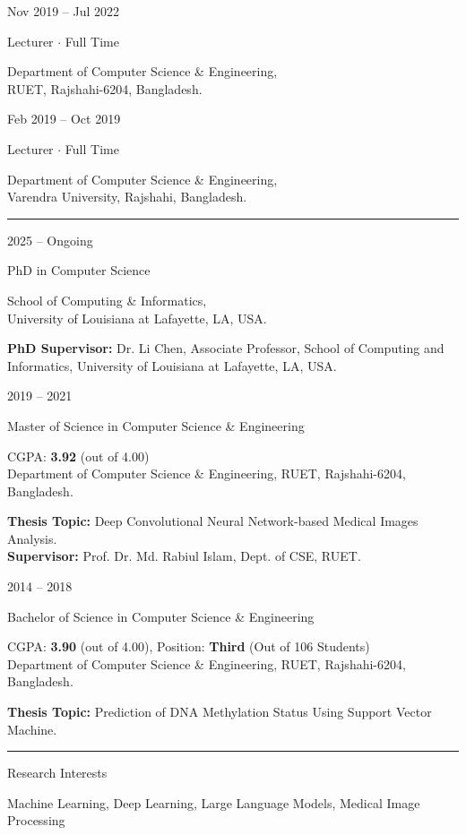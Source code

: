 \documentclass[a4paper,10pt]{article}
\newlength{\cvcolumngapwidth}
\newlength{\cvleftcolumnwidth}
\newlength{\cvrightcolumnwidth}
\newcommand{\cvsectionstyle}[1]{{\normalsize\cvsectionfont\textcolor{cvsectioncolor}{#1}}}
\newcommand{\cvtitlestyle}[1]{{\large\cvtitlefont\textcolor{cvtitlecolor}{#1}}}
\newcommand{\cvdurationstyle}[1]{{\small\cvdurationfont\textcolor{cvdurationcolor}{#1}}}
\newcommand{\cvheadingstyle}[1]{{\normalsize\cvheadingfont\textcolor{cvheadingcolor}{#1}}}
\newlength{\cvafteritemskipamount}
\newlength{\cvaftersectionskipamount}
\newlength{\cvbetweensectionandheadingextraskipamount}
\newlength{\cvaftertitleskipamount}
\newlength{\cvparskip}
\newcommand{\cvsection}[1]{
    \begin{minipage}[t]{\cvleftcolumnwidth}
        \raggedleft\cvsectionstyle{#1}
    \end{minipage}%
    \hspace{\cvcolumngapwidth}%
    \begin{minipage}[t]{\cvrightcolumnwidth}
        \textcolor{cvrulecolor}{\rule{\cvrightcolumnwidth}{0.3mm}}
    \end{minipage}

    \vspace{\cvaftersectionskipamount}
}
\newcommand{\cvitem}[2]{
    \begin{minipage}[t]{\cvleftcolumnwidth}
        \raggedleft #1
    \end{minipage}%
    \hspace{\cvcolumngapwidth}%
    \begin{minipage}[t]{\cvrightcolumnwidth}
        \setlength{\parskip}{\cvparskip} #2
    \end{minipage}

    \vspace{\cvafteritemskipamount}
}
\newcommand{\cvtitle}[1]{
    \cvtitlestyle{#1}

    \vspace{\cvaftertitleskipamount}
    \vspace{-\cvparskip}
}
\begin{document}
\cvitem{
    \cvdurationstyle{Nov 2019 -- Jul 2022}
}{
    \cvtitle{Lecturer $\cdot$ Full Time}

    Department of Computer Science \& Engineering,\\
    RUET, Rajshahi-6204, Bangladesh.
}

\cvitem{
    \cvdurationstyle{Feb 2019 -- Oct 2019}
}{
    \cvtitle{Lecturer $\cdot$ Full Time}

    Department of Computer Science \& Engineering,\\
    Varendra University, Rajshahi, Bangladesh.
}


\cvsection{EDUCATION}

\cvitem{
    \cvdurationstyle{2025 -- Ongoing}
}{
    \cvtitle{PhD in Computer Science}

    School of Computing \& Informatics,\\
    University of Louisiana at Lafayette, LA, USA.

    \textbf{PhD Supervisor:} Dr. Li Chen, Associate Professor, School of Computing and Informatics, University of Louisiana at Lafayette, LA, USA.
}

\cvitem{
    \cvdurationstyle{2019 -- 2021}
}{
    \cvtitle{Master of Science in Computer Science \& Engineering}
    CGPA: \textbf{3.92} (out of 4.00)\\
    Department of Computer Science \& Engineering, RUET, Rajshahi-6204, Bangladesh.

    \textbf{Thesis Topic:} Deep Convolutional Neural Network-based Medical Images Analysis.\\
    \textbf{Supervisor:} Prof. Dr. Md. Rabiul Islam, Dept. of CSE, RUET.
}

\cvitem{
    \cvdurationstyle{2014 -- 2018}
}{
    \cvtitle{Bachelor of Science in Computer Science \& Engineering}
    CGPA: \textbf{3.90} (out of 4.00), Position: \textbf{Third} (Out of 106 Students)\\
    Department of Computer Science \& Engineering, RUET, Rajshahi-6204, Bangladesh.

    \textbf{Thesis Topic:} Prediction of DNA Methylation Status Using Support Vector Machine.
}



\cvsection{SKILLS \& INTERESTS}

\vspace{\cvbetweensectionandheadingextraskipamount}

\cvitem{
    \cvheadingstyle{Research Interests}
}{
    Machine Learning, Deep Learning, Large Language Models, Medical Image Processing
}
\end{document}
